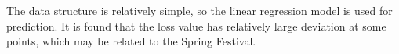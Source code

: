 \documentclass{tikzposter} %
\begin{document}
\begin{columns}
{
\begin{description}
  The data structure is relatively simple, so the linear regression model is used for prediction. It is found that the loss value has relatively large deviation at some points, which may be related to the Spring Festival.
\end{description}
}






\end{columns}




\end{document}
